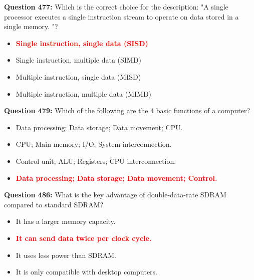 \documentclass[12pt,a4paper]{article}
\begin{document}
\vspace{0.5cm}

\textbf{Question 477:} Which is the correct choice for the description: "A single processor executes a single instruction stream to operate on data stored in a single memory. "?

\begin{itemize}
    \item[\textbf{A.}] \textcolor{red}{\textbf{Single instruction, single data (SISD)}}
    \item[\textbf{B.}] Single instruction, multiple data (SIMD)
    \item[\textbf{C.}] Multiple instruction, single data (MISD)
    \item[\textbf{D.}] Multiple instruction, multiple data (MIMD)
\end{itemize}

\vspace{0.5cm}

\textbf{Question 479:} Which of the following are the 4 basic functions of a computer?

\begin{itemize}
    \item[\textbf{A.}] Data processing; Data storage; Data movement; CPU.
    \item[\textbf{B.}] CPU; Main memory; I/O; System interconnection.
    \item[\textbf{C.}] Control unit; ALU; Registers; CPU interconnection.
    \item[\textbf{D.}] \textcolor{red}{\textbf{Data processing; Data storage; Data movement; Control.}}
\end{itemize}

\vspace{0.5cm}

\textbf{Question 486:} What is the key advantage of double-data-rate SDRAM compared to standard SDRAM?

\begin{itemize}
    \item[\textbf{A.}] It has a larger memory capacity.
    \item[\textbf{B.}] \textcolor{red}{\textbf{It can send data twice per clock cycle.}}
    \item[\textbf{C.}] It uses less power than SDRAM.
    \item[\textbf{D.}] It is only compatible with desktop computers.
\end{itemize}

\vspace{0.5cm}
\end{document}
